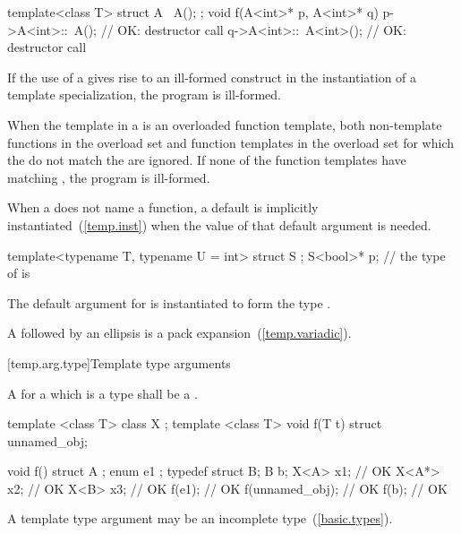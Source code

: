 \begin{codeblock}
template<class T> struct A {
  ~A();
};
void f(A<int>* p, A<int>* q) {
  p->A<int>::~A();              // OK: destructor call
  q->A<int>::~A<int>();         // OK: destructor call
}
\end{codeblock}
\exitexample

\pnum
If the use of a
gives rise to an ill-formed construct in the instantiation of a
template specialization, the program is ill-formed.

\pnum
When the template in a
is an overloaded function template, both non-template functions in the overload
set and function templates in the overload set for
which the
do not match the
are ignored.
If none of the function templates have matching
,
the program is ill-formed.

\pnum
When a  does not name a function,
a default  is
implicitly instantiated~(\ref{temp.inst})
when the value of that default argument is needed.
\enterexample
\begin{codeblock}
template<typename T, typename U = int> struct S { };
S<bool>* p; // the type of  is 
\end{codeblock}
The default argument for  is instantiated to form the type .
\exitexample

\pnum
A  followed by an ellipsis is
a pack expansion~(\ref{temp.variadic}).

[temp.arg.type]{Template type arguments}

\pnum
A
for a
which is a type
shall be a
.

\pnum
\enterexample
\begin{codeblock}
template <class T> class X { };
template <class T> void f(T t) { }
struct { } unnamed_obj;

void f() {
  struct A { };
  enum { e1 };
  typedef struct { } B;
  B b;
  X<A> x1;          // OK
  X<A*> x2;         // OK
  X<B> x3;          // OK
  f(e1);            // OK
  f(unnamed_obj);   // OK
  f(b);             // OK
}
\end{codeblock}
\exitexample
\enternote
A template type argument may be an incomplete type~(\ref{basic.types}).
\exitnote


